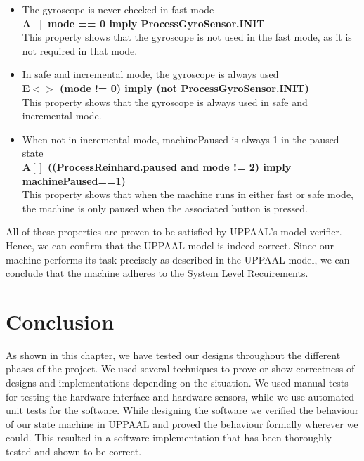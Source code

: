 \documentclass[a4paper,oneside,11pt]{article}
\begin{document}
\begin{itemize}
	\item The gyroscope is never checked in fast mode\\
		\textbf{A$[]$ mode == 0 imply ProcessGyroSensor.INIT}\\
		This property shows that the gyroscope is not used in the fast mode, as it is not required in that mode. 

	\item In safe and incremental mode, the gyroscope is always used\\
		\textbf{E$<>$ (mode != 0) imply (not ProcessGyroSensor.INIT)}\\
		This property shows that the gyroscope is always used in safe and incremental mode. 

	\item When not in incremental mode, machinePaused is always 1 in the paused state\\
		\textbf{A$[]$ ((ProcessReinhard.paused and mode != 2) imply machinePaused==1)}\\
		This property shows that when the machine runs in either fast or safe mode, the machine is only paused when the associated button is pressed.
\end{itemize}

All of these properties are proven to be satisfied by UPPAAL’s model verifier. Hence, we can confirm that the UPPAAL model is indeed correct. Since our machine performs its task precisely as described in the UPPAAL model, we can conclude that the machine adheres to the System Level Recuirements.

\section{Conclusion}
As shown in this chapter, we have tested our designs throughout the different phases of the project. We used several techniques to prove or show correctness of designs and implementations depending on the situation. We used manual tests for testing the hardware interface and hardware sensors, while we use automated unit tests for the software. While designing the software we verified the behaviour of our state machine in UPPAAL and proved the behaviour formally wherever we could. This resulted in a software implementation that has been thoroughly tested and shown to be correct.
\end{document}
